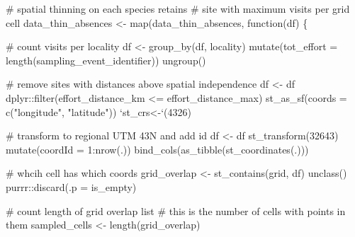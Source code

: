 \documentclass[
]{article}
\newenvironment{Shaded}{}{}
\newcommand{\CommentTok}[1]{\textcolor[rgb]{0.00,0.50,0.00}{#1}}
\newcommand{\ControlFlowTok}[1]{\textcolor[rgb]{0.00,0.00,1.00}{#1}}
\newcommand{\DataTypeTok}[1]{#1}
\newcommand{\DecValTok}[1]{#1}
\newcommand{\KeywordTok}[1]{\textcolor[rgb]{0.00,0.00,1.00}{#1}}
\newcommand{\NormalTok}[1]{#1}
\newcommand{\OperatorTok}[1]{#1}
\newcommand{\StringTok}[1]{\textcolor[rgb]{0.00,0.50,0.50}{#1}}
\begin{document}
\begin{Shaded}
\begin{Highlighting}[]
\CommentTok{# spatial thinning on each species retains}
\CommentTok{# site with maximum visits per grid cell}
\NormalTok{data_thin_absences <-}\StringTok{ }\KeywordTok{map}\NormalTok{(data_thin_absences, }\ControlFlowTok{function}\NormalTok{(df) \{}

  \CommentTok{# count visits per locality}
\NormalTok{  df <-}\StringTok{ }\KeywordTok{group_by}\NormalTok{(df, locality) }\OperatorTok{%
\StringTok{    }\KeywordTok{mutate}\NormalTok{(}\DataTypeTok{tot_effort =} \KeywordTok{length}\NormalTok{(sampling_event_identifier)) }\OperatorTok{%
\StringTok{    }\KeywordTok{ungroup}\NormalTok{()}

  \CommentTok{# remove sites with distances above spatial independence}
\NormalTok{  df <-}\StringTok{ }\NormalTok{df }\OperatorTok{%
\StringTok{    }\NormalTok{dplyr}\OperatorTok{::}\KeywordTok{filter}\NormalTok{(effort_distance_km }\OperatorTok{<=}\StringTok{ }\NormalTok{effort_distance_max) }\OperatorTok{%
\StringTok{    }\KeywordTok{st_as_sf}\NormalTok{(}\DataTypeTok{coords =} \KeywordTok{c}\NormalTok{(}\StringTok{"longitude"}\NormalTok{, }\StringTok{"latitude"}\NormalTok{)) }\OperatorTok{%
\StringTok{    `}\DataTypeTok{st_crs<-}\StringTok{`}\NormalTok{(}\DecValTok{4326}\NormalTok{)}

  \CommentTok{# transform to regional UTM 43N and add id}
\NormalTok{  df <-}\StringTok{ }\NormalTok{df }\OperatorTok{%
\StringTok{    }\KeywordTok{st_transform}\NormalTok{(}\DecValTok{32643}\NormalTok{) }\OperatorTok{%
\StringTok{    }\KeywordTok{mutate}\NormalTok{(}\DataTypeTok{coordId =} \DecValTok{1}\OperatorTok{:}\KeywordTok{nrow}\NormalTok{(.)) }\OperatorTok{%
\StringTok{    }\KeywordTok{bind_cols}\NormalTok{(}\KeywordTok{as_tibble}\NormalTok{(}\KeywordTok{st_coordinates}\NormalTok{(.)))}

  \CommentTok{# whcih cell has which coords}
\NormalTok{  grid_overlap <-}\StringTok{ }\KeywordTok{st_contains}\NormalTok{(grid, df) }\OperatorTok{%
\StringTok{    }\KeywordTok{unclass}\NormalTok{() }\OperatorTok{%
\StringTok{    }\NormalTok{purrr}\OperatorTok{::}\KeywordTok{discard}\NormalTok{(}\DataTypeTok{.p =}\NormalTok{ is_empty)}

  \CommentTok{# count length of grid overlap list}
  \CommentTok{# this is the number of cells with points in them}
\NormalTok{  sampled_cells <-}\StringTok{ }\KeywordTok{length}\NormalTok{(grid_overlap)}

}}}}}}}}}}
\end{Highlighting}
\end{Shaded}
\end{document}
